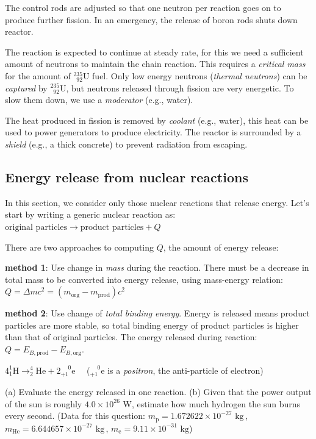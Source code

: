 \documentclass[a4paper,12pt]{book}
\newcounter{question}[chapter]
\begin{document}
The control rods are adjusted so that one neutron per reaction goes on to produce further fission. In an emergency, the release of boron rods shuts down reactor.

The reaction is expected to continue at steady rate, for this we need a sufficient amount of neutrons to maintain the chain reaction. This requires a \emph{critical mass} for the amount of $^{235}_{\phantom{1}92}\text{U}$ fuel. Only low energy neutrons (\emph{thermal neutrons}) can be \emph{captured} by $^{235}_{\phantom{1}92}\text{U}$, but neutrons released through fission are very energetic. To slow them down, we use a  \emph{moderator} (e.g., water).

The heat produced in fission is removed by \emph{coolant} (e.g., water), this heat can be used to power generators to produce electricity. The reactor is surrounded by a \emph{shield} (e.g., a thick concrete) to prevent radiation from escaping.

\subsection{Energy release from nuclear reactions}

In this section, we consider only those nuclear reactions that release energy. Let's start by writing a generic nuclear reaction as: $\text{original particles} \longrightarrow \text{product particles} + Q$

There are two approaches to computing $Q$, the amount of energy release:

\noindent \textbf{method 1}: Use change in \emph{mass} during the reaction.
There must be a decrease in total mass to be converted into energy release, using mass-energy relation: $Q=\Delta mc^2 = (m_\text{org} - m_\text{prod})c^2$

\noindent \textbf{method 2}: Use change of \emph{total binding energy}.
Energy is released means product particles are more stable, so total binding energy of product particles is higher than that of original particles. The energy released during reaction: $Q= E_{B,\text{prod}} - E_{B,\text{org}}$.

{

\centering

$4 ^1_1\text{H} \longrightarrow ^4_2\text{He} + 2 ^{\phantom{+}0}_{+1}\text{e} \quad$ ($^{\phantom{+}0}_{+1}\text{e}$ is a \emph{positron}, the anti-particle of electron)

}

\noindent (a) Evaluate the energy released in one reaction. (b) Given that the power output of the sun is roughly $4.0\times10^{26}\text{ W}$, estimate how much hydrogen the sun burns every second. (Data for this question: $m_\text{p}=1.672622\times10^{-27}\text{ kg} \,$, $m_\text{He}=6.644657\times10^{-27}\text{ kg} \,$,  $m_\text{e}=9.11\times10^{-31}\text{ kg}$)
\end{document}
